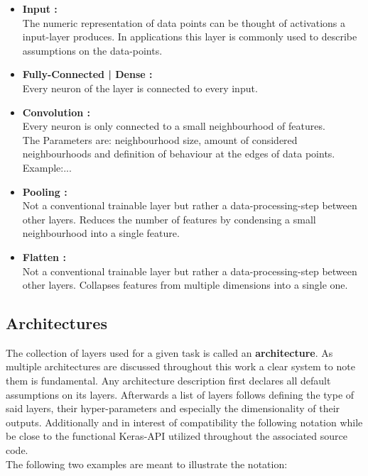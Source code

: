 \begin{itemize}
	\item \textbf{Input :}\\
	The numeric representation of data points can be thought of activations a input-layer produces. In applications this layer is commonly used to describe assumptions on the data-points.  \\
	\item \textbf{Fully-Connected | Dense :}\\
	Every neuron of the layer is connected to every input.\\
	\item \textbf{Convolution :}\\
	Every neuron is only connected to a small neighbourhood of features.\\
	The Parameters are: neighbourhood size, amount of considered neighbourhoods and definition of behaviour at the edges of data points.\\
	Example:...\\
	\item \textbf{Pooling :}\\
	Not a conventional trainable layer but rather a data-processing-step between other layers. Reduces the number of features by condensing a small neighbourhood into a single feature.\\
	\item \textbf{Flatten :}\\  
	Not a conventional trainable layer but rather a data-processing-step between other layers. Collapses features from multiple dimensions into a single one.\\
\end{itemize}

\subsection{Architectures}
The collection of layers used for a given task is called an \textbf{architecture}. As multiple architectures are discussed throughout this work a clear system to note them is fundamental. Any architecture description first declares all default assumptions on its layers. Afterwards a list of layers follows defining the type of said layers, their hyper-parameters and especially the dimensionality of their outputs. Additionally and in interest of compatibility the following notation while be close to the functional Keras-API utilized throughout the associated source code.\\
The following two examples are meant to illustrate the notation:

